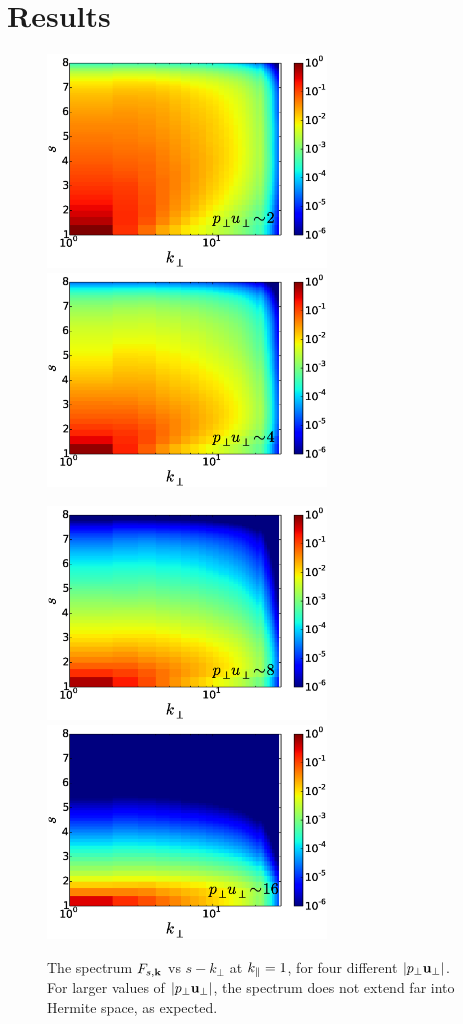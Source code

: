 \section{Results}
    
    \begin{figure}
    \begin{center}
        \includegraphics[width=7.4cm]{figs/phmixnlpp0/M100_2_vsskp.eps}
        \includegraphics[width=7.4cm]{figs/phmixnlpp0/M100_4_vsskp.eps}

        \includegraphics[width=7.4cm]{figs/phmixnlpp0/M100_8_vsskp.eps}
        \includegraphics[width=7.4cm]{figs/phmixnlpp0/M100_16_vsskp.eps}
        \caption{The spectrum $F_{s,\mathbf{k}}$ vs $s-k_\perp$ at $k_\parallel=1$, for four different 
        $\left|p_\perp \mathbf{u_\perp}\right|$.
        For larger values of $\left|p_\perp \mathbf{u_\perp}\right|$, the spectrum does not extend far into Hermite space, as expected.}
        \label{pp0:fig:vsskp}
    \end{center}
    \end{figure}

